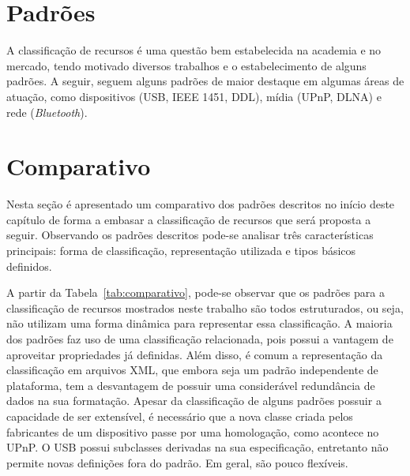 \section{Padrões}
\label{sec:padroes}

A classificação de recursos é uma questão bem estabelecida na academia e no mercado, tendo motivado diversos trabalhos e o estabelecimento de alguns padrões. A seguir, seguem alguns padrões de maior destaque em algumas áreas de atuação, como dispositivos (USB, IEEE 1451, DDL), mídia (UPnP, DLNA) e rede (\emph{Bluetooth}).








\section{Comparativo}
\label{sec:comparativo}

Nesta seção é apresentado um comparativo dos padrões descritos no início deste capítulo de forma a embasar a classificação de recursos que será proposta a seguir. Observando os padrões descritos pode-se analisar três características principais: forma de classificação, representação utilizada e tipos básicos definidos. 

A partir da Tabela~\ref{tab:comparativo}, pode-se observar que os padrões para a classificação de recursos mostrados neste trabalho são todos estruturados, ou seja, não utilizam uma forma dinâmica para representar essa classificação. A maioria dos padrões faz uso de uma classificação relacionada, pois possui a vantagem de aproveitar propriedades já definidas. Além disso, é comum a representação da classificação em arquivos XML, que embora seja um padrão independente de plataforma, tem a desvantagem de possuir uma considerável redundância de dados na sua formatação. Apesar da classificação de alguns padrões possuir a capacidade de ser extensível, é necessário que a nova classe criada pelos fabricantes de um dispositivo passe por uma homologação, como acontece no UPnP. O USB possui subclasses derivadas na sua especificação, entretanto não permite novas definições fora do padrão. Em geral, são pouco flexíveis. 

